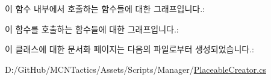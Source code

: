 이 함수 내부에서 호출하는 함수들에 대한 그래프입니다.\+:




이 함수를 호출하는 함수들에 대한 그래프입니다.\+:




이 클래스에 대한 문서화 페이지는 다음의 파일로부터 생성되었습니다.\+:\begin{DoxyCompactItemize}
\item 
D\+:/\+Git\+Hub/\+M\+C\+N\+Tactics/\+Assets/\+Scripts/\+Manager/\hyperlink{_placeable_creator_8cs}{Placeable\+Creator.\+cs}\end{DoxyCompactItemize}
